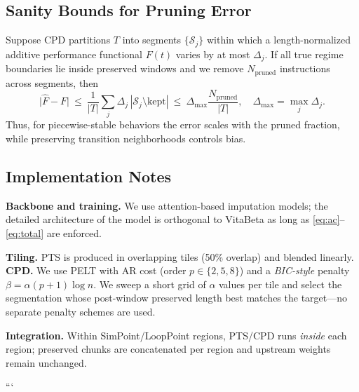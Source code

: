 \subsection{Sanity Bounds for Pruning Error}
Suppose CPD partitions \(T\) into segments \(\{\mathcal{S}_j\}\) within which a length-normalized additive performance functional \(F(t)\) varies by at most \(\Delta_j\). If all true regime boundaries lie inside preserved windows and we remove \(N_{\mathrm{pruned}}\) instructions across segments, then
\[
\big|\widehat{F}-F\big|\ \le\ \frac{1}{|T|}\sum_j \Delta_j\, |\mathcal{S}_j\setminus\text{kept}|\ \le\ \Delta_{\max}\frac{N_{\mathrm{pruned}}}{|T|}
,\quad \Delta_{\max}=\max_j\Delta_j.
\]
Thus, for piecewise-stable behaviors the error scales with the pruned fraction, while preserving transition neighborhoods controls bias.

\subsection{Implementation Notes}
\label{subsec:impl}
\textbf{Backbone and training.} We use attention-based imputation models; the detailed architecture of the model is orthogonal to VitaBeta as long as \eqref{eq:ac}–\eqref{eq:total} are enforced.

\textbf{Tiling.} PTS is produced in overlapping tiles (50\% overlap) and blended linearly. \textbf{CPD.} We use PELT with AR cost (order \(p\in\{2,5,8\}\)) and a \emph{BIC-style} penalty \(\beta=\alpha (p{+}1)\log n\). We sweep a short grid of \(\alpha\) values per tile and select the segmentation whose post-window preserved length best matches the target---no separate penalty schemes are used. 

\textbf{Integration.} Within SimPoint/LoopPoint regions, PTS/CPD runs \emph{inside} each region; preserved chunks are concatenated per region and upstream weights remain unchanged.

```
